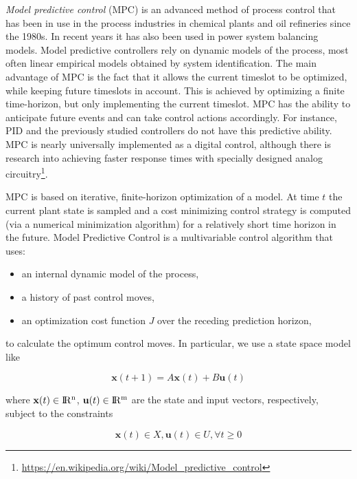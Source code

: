 \textit{Model predictive control} (MPC) is an advanced method of process control that has been in use in the process industries in chemical plants and oil refineries since the 1980s. In recent years it has also been used in power system balancing models. Model predictive controllers rely on dynamic models of the process, most often linear empirical models obtained by system identification. The main advantage of MPC is the fact that it allows the current timeslot to be optimized, while keeping future timeslots in account. This is achieved by optimizing a finite time-horizon, but only implementing the current timeslot. MPC has the ability to anticipate future events and can take control actions accordingly. For instance, PID and the previously studied controllers do not have this predictive ability. MPC is nearly universally implemented as a digital control, although there is research into achieving faster response times with specially designed analog circuitry\footnote{\url{https://en.wikipedia.org/wiki/Model_predictive_control}}.

\noindent MPC is based on iterative, finite-horizon optimization of a model. At time $t$ the current plant state is sampled and a cost minimizing control strategy is computed (via a numerical minimization algorithm) for a relatively short time horizon in the future. Model Predictive Control is a multivariable control algorithm that uses:

\begin{itemize}
	\item an internal dynamic model of the process,
	\item a history of past control moves,
	\item an optimization cost function $J$ over the receding prediction horizon,
\end{itemize}

\noindent to calculate the optimum control moves. In particular, we use a state space model like

\begin{equation}
	\mathbf{x}(t+1) = A\mathbf{x}(t) + B\mathbf{u}(t)
\end{equation}

\noindent where $\mathbf{x}(t) \in \rm I\!R^n$, $\mathbf{u}(t) \in \rm I\!R^m$ are the state and input vectors, respectively, subject to the constraints 

\begin{equation}
	\mathbf{x}(t) \in X, \mathbf{u}(t) \in U, \forall t \ge 0
\end{equation}  

